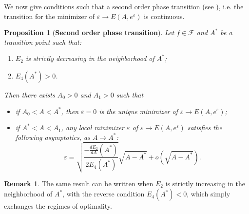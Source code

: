 \documentclass[12pt]{interact}
\newtheorem{prop}[thm]{Proposition}
\theoremstyle{definition}
\newtheorem{remark}[thm]{Remark}
\begin{document}
We now give conditions such that a second order phase transition (see \cite{Samaj13}), i.e. the transition for the minimizer of $\varepsilon\to E(A,e^\varepsilon)$ is continuous.

\begin{prop}[\textbf{Second order phase transition}]\label{prop:2ndorder}
Let $f\in \mathcal{F}$ and $A^*$ be a transition point such that:
\begin{enumerate}
\item $E_2$ is strictly decreasing in the neighborhood of $A^*$;
\item $E_4(A^*)>0$.
\end{enumerate}
Then there exists $A_0>0$ and $A_1>0$ such that
\begin{itemize}
\item[•] if $A_0<A<A^*$, then $\varepsilon=0$ is the unique minimizer of $\varepsilon\to E(A,e^\varepsilon)$;
\item[•] if $A^*<A<A_1$, any local minimizer $\varepsilon$ of $\varepsilon\to E(A,e^\varepsilon)$ satisfies the following asymptotics, as $A\to A^*$:
$$
\varepsilon=\sqrt{\frac{-\frac{dE_2}{dA}(A^*)}{2E_4(A^*)}}\sqrt{A-A^*}+o(\sqrt{A-A^*}).
$$
\end{itemize}
\end{prop}
\begin{remark}
The same result can be written when $E_2$ is strictly increasing in the neighborhood of $A^*$, with the reverse condition $E_4(A^*)<0$, which simply exchanges the regimes of optimality.
\end{remark}
\end{document}

